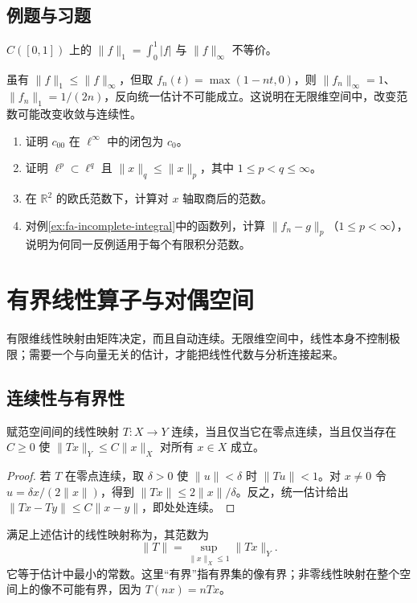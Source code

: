 \documentclass[UTF8,12pt,a4paper,fontset=fandol]{ctexbook}
\begin{document}
\section{例题与习题}
\begin{example}[不同范数的作用]
$C([0,1])$ 上的 $\|f\|_1=\int_0^1|f|$ 与 $\|f\|_\infty$ 不等价。
\end{example}
\begin{solve}
虽有 $\|f\|_1\leq\|f\|_\infty$，但取 $f_n(t)=\max(1-nt,0)$，则 $\|f_n\|_\infty=1$、$\|f_n\|_1=1/(2n)$，反向统一估计不可能成立。这说明在无限维空间中，改变范数可能改变收敛与连续性。
\end{solve}
\begin{enumerate}
 \item 证明 $c_{00}$ 在 $\ell^\infty$ 中的闭包为 $c_0$。
 \item\label{exer:fa-lp-inclusion} 证明 $\ell^p\subset\ell^q$ 且 $\|x\|_q\leq\|x\|_p$，其中 $1\leq p<q\leq\infty$。
 \item 在 $\mathbb R^2$ 的欧氏范数下，计算对 $x$ 轴取商后的范数。
 \item 对例\ref{ex:fa-incomplete-integral}中的函数列，计算 $\|f_n-g\|_p$（$1\leq p<\infty$），说明为何同一反例适用于每个有限积分范数。
\end{enumerate}

\chapter{有界线性算子与对偶空间}
\label{chap:fa-operators}

有限维线性映射由矩阵决定，而且自动连续。无限维空间中，线性本身不控制极限；需要一个与向量无关的估计，才能把线性代数与分析连接起来。

\section{连续性与有界性}
\begin{theorem}\label{thm:fa-bounded-continuous}
赋范空间间的线性映射 $T:X\to Y$ 连续，当且仅当它在零点连续，当且仅当存在 $C\geq0$ 使 $\|Tx\|_Y\leq C\|x\|_X$ 对所有 $x\in X$ 成立。
\end{theorem}
\begin{proof}
若 $T$ 在零点连续，取 $\delta>0$ 使 $\|u\|<\delta$ 时 $\|Tu\|<1$。对 $x\ne0$ 令 $u=\delta x/(2\|x\|)$，得到 $\|Tx\|\leq2\|x\|/\delta$。反之，统一估计给出 $\|Tx-Ty\|\leq C\|x-y\|$，即处处连续。
\end{proof}
满足上述估计的线性映射称为，其范数为
\begin{equation}
 \|T\|=\sup_{\|x\|_X\leq1}\|Tx\|_Y.
 \label{eq:fa-operator-norm}
\end{equation}
它等于估计中最小的常数。这里“有界”指有界集的像有界；非零线性映射在整个空间上的像不可能有界，因为 $T(nx)=nTx$。
\end{document}

